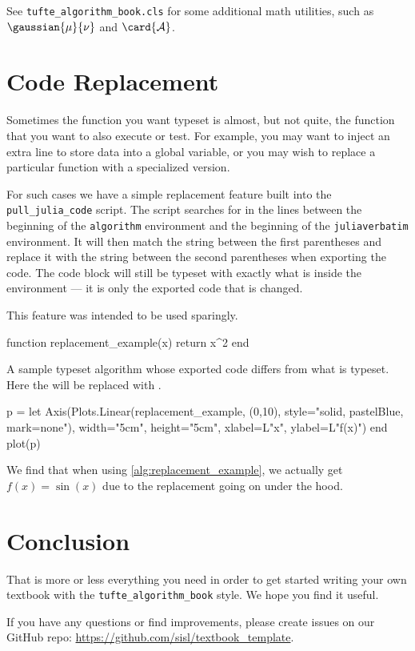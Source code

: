 See \texttt{tufte\_algorithm\_book.cls} for some additional math utilities, such as $\gaussian{\mu}{\nu}$ and $\card{\mathcal{A}}$.

\section{Code Replacement}

Sometimes the function you want typeset is almost, but not quite, the function that you want to also execute or test.
For example, you may want to inject an extra line to store data into a global variable, or you may wish to replace a particular function with a specialized version.

For such cases we have a simple replacement feature built into the \texttt{pull\_julia\_code} script.
The script searches for  in the lines between the beginning of the \texttt{algorithm} environment and the beginning of the \texttt{juliaverbatim} environment.
It will then match the string between the first parentheses and replace it with the string between the second parentheses when exporting the code.
The code block will still be typeset with exactly what is inside the environment --- it is only the exported code that is changed.

This feature was intended to be used sparingly.

\begin{algorithm}
\begin{juliaverbatim}
function replacement_example(x)
	return x^2
end
\end{juliaverbatim}
\caption{
	\label{alg:replacement_example}
	A sample typeset algorithm whose exported code differs from what is typeset.
	Here the  will be replaced with .
}
\end{algorithm}

\begin{marginfigure}[6cm]
	\begin{jlcode}
	p = let
		Axis(Plots.Linear(replacement_example, (0,10), style="solid, pastelBlue, mark=none"),
			 width="5cm", height="5cm", xlabel=L"x", ylabel=L"f(x)")
	end
	plot(p)
	\end{jlcode}
	\begin{center}
	\end{center}
	\caption{
		\label{fig:sample_marginfigure}
		We find that when using \cref{alg:replacement_example}, we actually get $f(x) = \sin(x)$ due to the replacement going on under the hood.
	}
\end{marginfigure}

\section{Conclusion}

That is more or less everything you need in order to get started writing your own textbook with the \texttt{tufte\_algorithm\_book} style.
We hope you find it useful.

If you have any questions or find improvements, please create issues on our GitHub repo: \url{https://github.com/sisl/textbook_template}.